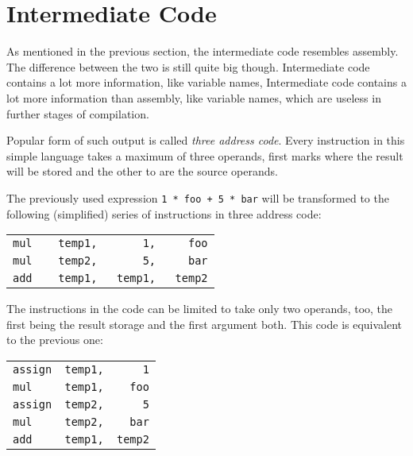     \section{Intermediate Code}

            As mentioned in the previous section, the intermediate code resembles assembly. The difference between the two is still quite big though. Intermediate code contains a lot more information, like variable names, 
            Intermediate code contains a lot more information than assembly, like variable names, which are useless in further stages of compilation.

            Popular form of such output is called \emph{three address code}. Every instruction in this simple language takes a maximum of three operands, first marks where the result will be stored and the other to are the source operands.

            The previously used expression \texttt{1 * foo + 5 * bar} will be transformed to the following (simplified) series of instructions in three address code:\\

            \begin{center}\begin{tabular}{l}
            \verb|mul    temp1,       1,     foo|\\
            \verb|mul    temp2,       5,     bar|\\
            \verb|add    temp1,   temp1,   temp2|\\
            \end{tabular}\end{center}

            The instructions in the code can be limited to take only two operands, too, the first being the result storage and the first argument both. This code is equivalent to the previous one:

            \begin{center}\begin{tabular}{l}
            \verb|assign  temp1,      1|\\
            \verb|mul     temp1,    foo|\\
            \verb|assign  temp2,      5|\\
            \verb|mul     temp2,    bar|\\
            \verb|add     temp1,  temp2|\\
            \end{tabular}\end{center}


